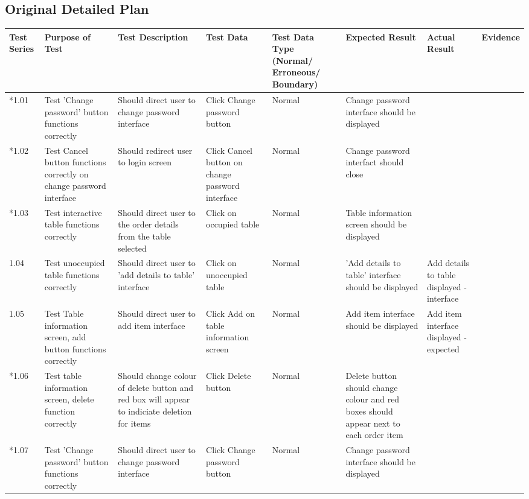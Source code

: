 \begin{landscape}
\subsection{Original Detailed Plan}

\begin{center}
    \begin{longtable}{|p{1.5cm}|p{2.5cm}|p{2.5cm}|p{2cm}|p{2cm}|p{2cm}|p{2cm}|p{2cm}|}
        \hline
        \textbf{Test Series} & \textbf{Purpose of Test} & \textbf{Test Description} & \textbf{Test Data} & \textbf{Test Data Type (Normal/ Erroneous/ Boundary)} & \textbf{Expected Result} & \textbf{Actual Result} & \textbf{Evidence}\\ \hline
        *1.01 & Test 'Change password' button functions correctly & Should direct user to change password interface  & Click Change password button & Normal & Change password interface should be displayed &  &  \\ \hline
        *1.02 & Test Cancel button functions correctly on change password interface & Should redirect user to login screen  & Click Cancel button on change password interface & Normal & Change password interfact should close &  &  \\ \hline
        *1.03 & Test interactive table functions correctly & Should direct user to the order details from the table selected  & Click on occupied table & Normal & Table  information screen should be displayed &  &  \\ \hline
        1.04 & Test unoccupied table functions correctly & Should direct user to 'add details to table'  interface  & Click on unoccupied table & Normal & 'Add details to table' interface should be displayed & Add details to table displayed - interface &  \\ \hline
        1.05 & Test Table information screen, add button functions correctly & Should direct user to add item  interface  & Click Add on table information screen & Normal & Add item interface should be displayed & Add item interface displayed - expected  &  \\ \hline
        *1.06 & Test table information screen, delete function correctly & Should change colour of delete button and red box will appear to indiciate deletion for items  & Click Delete button & Normal & Delete button should change colour and red boxes should appear next to each order item &  &  \\ \hline
        *1.07 & Test 'Change password' button functions correctly & Should direct user to change password interface  & Click Change password button & Normal & Change password interface should be displayed &  &  \\ \hline

\end{longtable}
\end{center}
\end{landscape}
